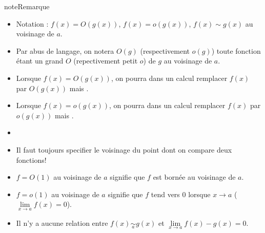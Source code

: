 \documentclass[letterpaper,10pt,french]{jupyterBook}
\begin{document}
\begin{sphinxadmonition}{note}{Remarque}
\begin{itemize}
\item {} 
\sphinxAtStartPar
Notation : \(f(x) = O(g(x))\), \(f(x) = o(g(x))\), \(f(x) \sim g(x)\) au voisinage de \(a\).

\item {} 
\sphinxAtStartPar
Par abus de langage, on notera \(O(g)\) (respectivement \(o(g)\)) toute fonction étant un grand \(O\)  (repectivement petit \(o\)) de \(g\) au voisinage de \(a\).

\item {} 
\sphinxAtStartPar
Lorsque \(f(x) = O(g(x))\), on pourra dans un calcul remplacer \(f(x)\) par \(O(g(x))\) mais .

\item {} 
\sphinxAtStartPar
Lorsque \(f(x) = o(g(x))\), on pourra dans un calcul remplacer \(f(x)\) par \(o(g(x))\) mais .

\item {} 
\sphinxAtStartPar
{}

\item {} 
\sphinxAtStartPar
Il faut toujours specifier le voisinage du point dont on compare deux fonctions!

\item {} 
\sphinxAtStartPar
\(f = O(1)\) au voisinage de \(a\) signifie que \(f\) est bornée au voisinage de \(a\).

\item {} 
\sphinxAtStartPar
\(f = o(1)\) au voisinage de \(a\) signifie que \(f\) tend vers \(0\) lorsque \(x\to a\) (\(\underset{x\to a}{\lim} f(x) = 0\)).

\item {} 
\sphinxAtStartPar
Il n’y a aucune relation entre \(f(x) \underset{a}{\sim} g(x)\) et \(\underset{x\to a}{\lim} f(x) - g(x) = 0\).

\end{itemize}
\end{sphinxadmonition}
\end{document}
